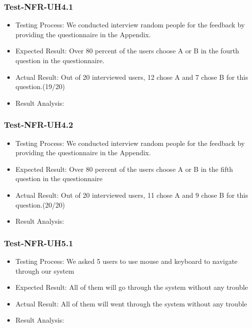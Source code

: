 \documentclass[12pt, titlepage]{article}
\begin{document}
            \subsubsection{Test-NFR-UH4.1}
\begin{itemize}
    \item Testing Process: We conducted interview random people for the feedback by providing the questionnaire in the Appendix.
    \item Expected Result: Over 80 percent of the users choose A or B in the fourth question in the questionnaire.
    \item Actual Result: Out of 20 interviewed users, 12 chose A and 7 chose B for this question.(19/20)
    \item Result Analysis: \pass
\end{itemize}

            \subsubsection{Test-NFR-UH4.2}
\begin{itemize}
    \item Testing Process: We conducted interview random people for the feedback by providing the questionnaire in the Appendix.
    \item Expected Result: Over 80 percent of the users choose A or B in the fifth question in the questionnaire
    \item Actual Result: Out of 20 interviewed users, 11 chose A and 9 chose B for this question.(20/20)
    \item Result Analysis: \pass
\end{itemize}

            \subsubsection{Test-NFR-UH5.1}
\begin{itemize}
    \item Testing Process: We asked 5 users to use mouse and keyboard to navigate through our system
    \item Expected Result: All of them will go through the system without any trouble
    \item Actual Result: All of them will went through the system without any trouble
    \item Result Analysis: \pass
\end{itemize}
\end{document}
